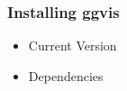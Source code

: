 \documentclass[MASTER.tex]{subfiles}
\begin{document}
 

\begin{frame}
\frametitle{Installing ggvis}
\begin{itemize}
\item Current Version
\item Dependencies

\end{itemize}
\end{frame}

\end{document}
